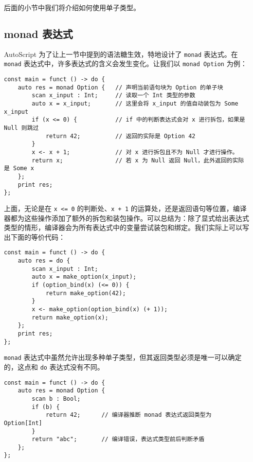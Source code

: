后面的小节中我们将介绍如何使用单子类型。

\subsection{monad 表达式}

AutoScript 为了让上一节中提到的语法糖生效，特地设计了 \lstinline!monad! 表达式。在 \lstinline!monad! 表达式中，许多表达式的含义会发生变化。让我们以 \lstinline!monad Option! 为例：

\begin{minipage}[c]{0.95\textwidth}
\vspace{1.0em}
\begin{lstlisting}
const main = funct () -> do {
	auto res = monad Option {	// 声明当前语句块为 Option 的单子块
		scan x_input : Int;		// 读取一个 Int 类型的参数
		auto x = x_input;		// 这里会将 x_input 的值自动装包为 Some x_input
		if (x <= 0) {			// if 中的判断表达式会对 x 进行拆包，如果是 Null 则跳过
			return 42;			// 返回的实际是 Option 42
		}
		x <- x + 1;				// 对 x 进行拆包且不为 Null 才进行操作。
		return x;				// 若 x 为 Null 返回 Null，此外返回的实际是 Some x
	};
	print res;
};
\end{lstlisting}
\end{minipage}


上面，无论是在 \lstinline!x <= 0! 的判断处、\lstinline!x + 1! 的运算处，还是返回语句等位置，编译器都为这些操作添加了额外的拆包和装包操作。可以总结为：除了显式给出表达式类型的情形，编译器会为所有表达式中的变量尝试装包和绑定。我们实际上可以写出下面的等价代码：

\begin{lstlisting}
const main = funct () -> do {
	auto res = do {
	    scan x_input : Int;
	    auto x = make_option(x_input);
	    if (option_bind(x) (<= 0)) {
	        return make_option(42);
	    }
	    x <- make_option(option_bind(x) (+ 1));
		return make_option(x);
	};
	print res;
};
\end{lstlisting}

\lstinline!monad! 表达式中虽然允许出现多种单子类型，但其返回类型必须是唯一可以确定的，这点和 \lstinline!do! 表达式没有不同。

\begin{lstlisting}
const main = funct () -> do {
	auto res = monad Option {
		scan b : Bool;
		if (b) {
			return 42;		// 编译器推断 monad 表达式返回类型为 Option[Int]
		}
		return "abc";		// 编译错误，表达式类型前后判断矛盾
	};
};
\end{lstlisting}

